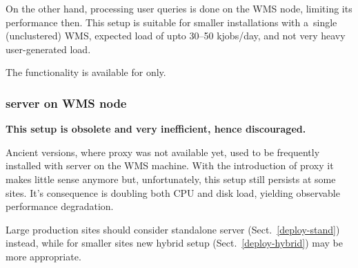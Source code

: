 On the other hand, processing user queries is done on the WMS node,
limiting its performance then.
This setup is suitable for smaller installations with a~single (unclustered)
WMS, expected load of upto 30--50 kjobs/day, and not very heavy user-generated
load.

The functionality is available for \LBnew only.


\subsubsection{\LB server on WMS node}

\textbf{This setup is obsolete and very inefficient, hence discouraged.}

Ancient \LB versions, where \LB proxy was not available yet,
used to be frequently installed with \LB server on the WMS machine.
With the introduction of \LB proxy it makes little sense anymore
but, unfortunately, this setup still persists at some sites.
It's consequence is doubling both CPU and disk load, yielding observable
performance degradation.

Large production sites should consider standalone \LB server (Sect.~\ref{deploy-stand})
instead, while for smaller sites new hybrid setup (Sect.~\ref{deploy-hybrid}) may
be more appropriate.
